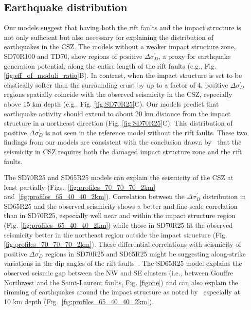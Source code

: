\documentclass[draft]{agujournal2018}
\begin{document}
\subsection{Earthquake distribution}
Our models suggest that having both the rift faults and the impact structure is not only sufficient but also necessary for explaining the distribution of earthquakes in the CSZ. The models without a weaker impact structure zone, SD70R100 and TD70, show regions of positive $\Delta \sigma_{D}^{\prime}$, a proxy for earthquake generation potential, along the entire length of the rift faults (e.g., Fig. \ref{fig:eff_of_moduli_ratio}B). In contrast, when the impact structure is set to be elastically softer than the surrounding crust by up to a factor of 4, positive $\Delta \sigma_{D}^{\prime}$ regions spatially coincide with the observed seismicity in the CSZ, especially above 15 km depth (e.g., Fig. \ref{fig:SD70R25}C). Our models predict that earthquake activity should extend to about 20 km distance from the impact structure in a northeast direction (Fig. \ref{fig:SD70R25}C). This distribution of positive $\Delta \sigma_{D}^{\prime}$ is not seen in the reference model without the rift faults. These two findings from our models are consistent with the conclusion drawn by~\citet{Thomas_Powell_2017} that the seismicity in CSZ requires both the damaged impact structure zone and the rift faults.

The SD70R25 and SD65R25 models can explain the seismicity of the CSZ at least partially (Figs.~\ref{fig:profiles_70_70_70_2km} and~\ref{fig:profiles_65_40_40_2km}). Correlation between the $\Delta\sigma_{D}^{\prime}$ distribution in SD65R25 and the observed seismicity shows a better and fine-scale correlation than in SD70R25, especially well near and within the impact structure region (Fig. \ref{fig:profiles_65_40_40_2km}) while those in SD70R25 fit the observed seismicity better in the northeast region outside the impact structure (Fig. \ref{fig:profiles_70_70_70_2km}). These differential correlations with seismicity of positive $\Delta \sigma_{D}^{\prime}$ regions in SD70R25 and SD65R25 might be suggesting along-strike variations in the dip angles of the rift faults~\citep[e.g.,][]{Baird_2010}. The SD65R25 model explains the observed seismic gap between the NW and SE clusters (i.e., between Gouffre Northwest and the Saint-Laurent faults, Fig. \ref{figone}) and can also explain the rimming of earthquakes around the impact structure as noted by~\citet{Powell_2017} especially at 10 km depth (Fig.~\ref{fig:profiles_65_40_40_2km}). 
\end{document}
